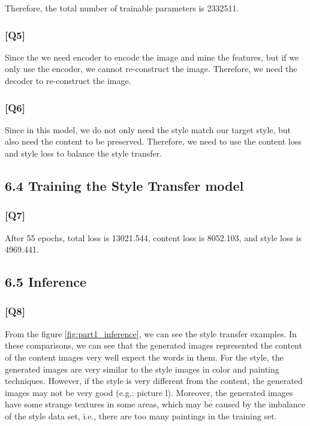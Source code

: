 \documentclass{article}
\begin{document}
Therefore, the total number of trainable parameters is 2332511.

\subsubsection*{[Q5]}
Since the we need encoder to encode the image and mine the features, but if we only use the encoder, we cannot re-construct the image. 
Therefore, we need the decoder to re-construct the image.

\subsubsection*{[Q6]}
Since in this model, we do not only need the style match our target style, but also need the content to be preserved.
Therefore, we need to use the content loss and style loss to balance the style transfer.

\subsection*{6.4 Training the Style Transfer model}

\subsubsection*{[Q7]}

After 55 epochs, total loss is 13021.544, content loss is 8052.103, and style loss is 4969.441.

\subsection*{6.5 Inference}

\subsubsection*{[Q8]}

From the figure \ref{fig:part1_inference}, we can see the style transfer examples.
In these comparisons, we can see that the generated images represented the content of the content images very well expect the words in them.
For the style, the generated images are very similar to the style images in color and painting techniques.
However, if the style is very different from the content, the generated images may not be very good (e.g.: picture l).
Moreover, the generated images have some strange textures in some areas, which may be caused by the imbalance of the style data set, i.e., there are too many paintings in the training set.
\end{document}
